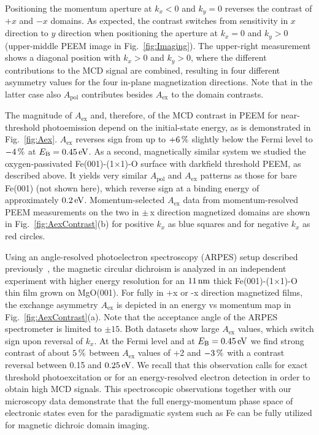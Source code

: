 \documentclass[prl,twocolumn,floatfix,superscriptaddress,aps]{revtex4-2}
\begin{document}
Positioning the momentum aperture at $k_x < 0$ and $k_y = 0$ reverses the contrast of $+x$ and $-x$ domains. As expected, the contrast switches from sensitivity in $x$ direction to $y$ direction when positioning the aperture at $k_x = 0$ and $k_y > 0$ (upper-middle PEEM image in Fig.~\ref{fig:Imaging}). The upper-right measurement shows a diagonal position with $k_x > 0$ and $k_y > 0$, where the different contributions to the MCD signal are combined, resulting in four different asymmetry values for the four in-plane magnetization directions. Note that in the latter case also $A_{\mathrm{pol}}$ contributes besides $A_{\mathrm{ex}}$ to the domain contrasts. 

The magnitude of $A_{\mathrm{ex}}$ and, therefore, of the MCD contrast in PEEM for near-threshold photoemission depend on the initial-state energy, as is demonstrated in Fig.~\ref{fig:Aex}. $A_{\mathrm{ex}}$ reverses sign from up to $\unit[+6]{\%}$ slightly below the Fermi level to $\unit[-4]{\%}$ at $E_{\mathrm{B}} = \unit[0.45]{eV}$. 
As a second, magnetically similar system we studied the oxygen-passivated Fe(001)-(1$\times$1)-O surface with darkfield threshold PEEM, as described above. It yields very similar $A_{\mathrm{pol}}$ and $A_{\mathrm{ex}}$ patterns as those for bare Fe(001) (not shown here), which reverse sign at a binding energy of approximately $\unit[0.2]{eV}$. Momentum-selected $A_{\mathrm{ex}}$ data from momentum-resolved PEEM measurements on 
the two in $\pm$\,x direction magnetized domains are shown in Fig.~\ref{fig:AexContrast}(b) for positive $k_x$ as blue squares and for negative $k_x$ as red circles. 

Using an angle-resolved photoelectron spectroscopy (ARPES) setup described previously~\cite{gillmeister2018, gillmeister2020}, the magnetic circular dichroism is analyzed in an independent experiment with higher energy resolution for an $\unit[11]{nm}$ thick Fe(001)-(1$\times$1)-O thin film grown on MgO(001). For fully in +x or -x direction magnetized films, the exchange asymmetry $A_{\mathrm{ex}}$ is depicted in an energy vs momentum map in Fig.~\ref{fig:AexContrast}(a). Note that the acceptance angle of the ARPES spectrometer is limited to $\pm15$\textdegree. Both datasets show large $A_{\mathrm{ex}}$ values, which switch sign upon reversal of $k_x$. At the Fermi level and at $E_{\mathrm{B}} = \unit[0.45]{eV}$ we find strong contrast of about $\unit[5]{\%}$ between $A_{\mathrm{ex}}$ values of +2 and $\unit[-3]{\%}$ with a contrast reversal between 0.15 and $\unit[0.25]{eV}$. We recall that this observation calls for exact threshold photoexcitation or for an energy-resolved electron detection in order to obtain high MCD signals. 
This spectroscopic observations together with our microscopy data demonstrate that the full energy-momentum phase space of electronic states even for the paradigmatic system such as Fe can be fully utilized for magnetic dichroic domain imaging.
\end{document}
